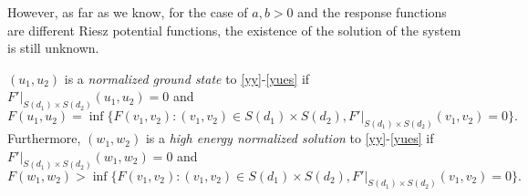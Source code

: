 \documentclass[reqno]{amsart}
\begin{document}
However, as far as we know, for the case of $a,b>0$ and the response functions are
different Riesz potential functions,
the existence of the solution of the system is still unknown.

\begin{definition}\label{df82} \rm
 $(u_1,u_2)$ is a \emph{normalized ground state} to \eqref{yy}-\eqref{yues}
if $F'|_{S(d_1)\times S(d_2)}(u_1,u_2)=0$ and
\[
 F(u_1,u_2)=\inf\{F(v_1,v_2): (v_1,v_2)\in S(d_1)\times S(d_2),
  F'|_{S(d_1)\times S(d_2)}(v_1,v_2)=0\}.
\]
Furthermore, $(w_1,w_2)$ is a \emph{high energy normalized solution}
to \eqref{yy}-\eqref{yues} if $F'|_{S(d_1)\times S(d_2)}(w_1,w_2)=0$ and
\[
 F(w_1,w_2)>\inf\{F(v_1,v_2): (v_1,v_2)\in S(d_1)\times S(d_2),
 F'|_{S(d_1)\times S(d_2)}(v_1,v_2)=0\}.
\]
\end{definition}
\end{document}
